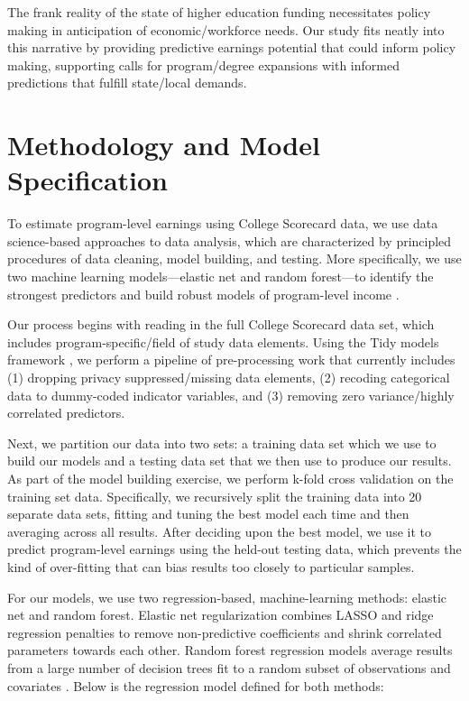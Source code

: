 \documentclass[a4paper, 12pt]{article}
\begin{document}
The frank reality of the state of higher education funding necessitates policy making in anticipation of economic/workforce needs. Our study fits neatly into this narrative by providing predictive earnings potential that could inform policy making, supporting calls for program/degree expansions with informed predictions that fulfill state/local demands.

\section*{Methodology and Model Specification}

To estimate program-level earnings using College Scorecard data, we use data science-based approaches to data analysis, which are characterized by principled procedures of data cleaning, model building, and testing. More specifically, we use two machine learning models---elastic net and random forest---to identify the strongest predictors and build robust models of program-level income \parencite{Hastie_etal_2016, Kuhn_Silge_2022}.

Our process begins with reading in the full College Scorecard data set, which includes program-specific/field of study data elements. Using the Tidy models framework \parencite{Kuhn_Silge_2022}, we perform a pipeline of pre-processing work that currently includes (1) dropping privacy suppressed/missing data elements, (2) recoding categorical data to dummy-coded indicator variables, and (3) removing zero variance/highly correlated predictors.

Next, we partition our data into two sets: a training data set which we use to build our models and a testing data set that we then use to produce our results. As part of the model building exercise, we perform k-fold cross validation on the training set data. Specifically, we recursively split the training data into 20 separate data sets, fitting and tuning the best model each time and then averaging across all results. After deciding upon the best model, we use it to predict program-level earnings using the held-out testing data, which prevents the kind of over-fitting that can bias results too closely to particular samples.

For our models, we use two regression-based, machine-learning methods: elastic net and random forest. Elastic net regularization combines LASSO and ridge regression penalties to remove non-predictive coefficients and shrink correlated parameters towards each other. Random forest regression models average results from a large number of decision trees fit to a random subset of observations and covariates \parencite{Hastie_etal_2016}. Below is the regression model defined for both methods: 
\end{document}
